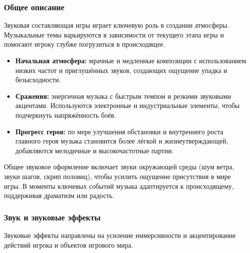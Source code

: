 \documentclass[12pt]{article}
\begin{document}
        \subsubsection{Общее описание}
        Звуковая составляющая игры играет ключевую роль в создании атмосферы. Музыкальные темы варьируются в зависимости от текущего этапа игры и помогают игроку глубже погрузиться в происходящее.
        \begin{itemize}
            \item \textbf{Начальная атмосфера:} мрачные и медленные композиции с использованием низких частот и приглушённых звуков, создающих ощущение упадка и безысходности.
            \item \textbf{Сражения:} энергичная музыка с быстрым темпом и резкими звуковыми акцентами. Используются электронные и индустриальные элементы, чтобы подчеркнуть напряжённость боёв.
            \item \textbf{Прогресс героя:} по мере улучшения обстановки и внутреннего роста главного героя музыка становится более лёгкой и жизнеутверждающей, добавляются мелодичные и высокочастотные партии.
        \end{itemize}
    
        Общее звуковое оформление включает звуки окружающей среды (шум ветра, звуки шагов, скрип половиц), чтобы усилить ощущение присутствия в мире игры. В моменты ключевых событий музыка адаптируется к происходящему, поддерживая драматизм или радость.
    
        \subsubsection{Звук и звуковые эффекты}
        Звуковые эффекты направлены на усиление иммерсивности и акцентирование действий игрока и объектов игрового мира.
    
\end{document}
